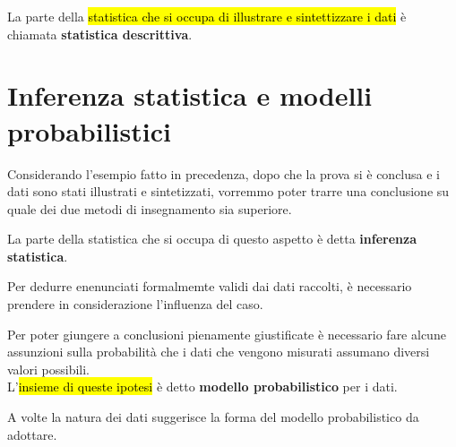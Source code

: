\bigskip
La parte della \hl{statistica che si occupa di illustrare e sintettizzare i dati} è chiamata \textcolor{viola}{\textbf{statistica descrittiva}}.

\section{Inferenza statistica e modelli probabilistici}
Considerando l'esempio fatto in precedenza, dopo che la prova si è conclusa e i dati sono stati illustrati e sintetizzati, vorremmo poter trarre una conclusione su quale dei due metodi di insegnamento sia superiore.

\medskip
La parte della statistica che si occupa di questo aspetto è detta \textcolor{viola}{\textbf{inferenza statistica}}.

Per dedurre enenunciati formalmemte validi dai dati raccolti, è necessario prendere in considerazione l'influenza del caso.


Per poter giungere a conclusioni pienamente giustificate è necessario fare alcune assunzioni sulla probabilità che i dati che vengono misurati assumano diversi valori possibili.\\[0.2ex]
L'\hl{insieme di queste ipotesi} è detto \textbf{modello probabilistico} per i dati.

A volte la natura dei dati suggerisce la forma del modello probabilistico da adottare.



